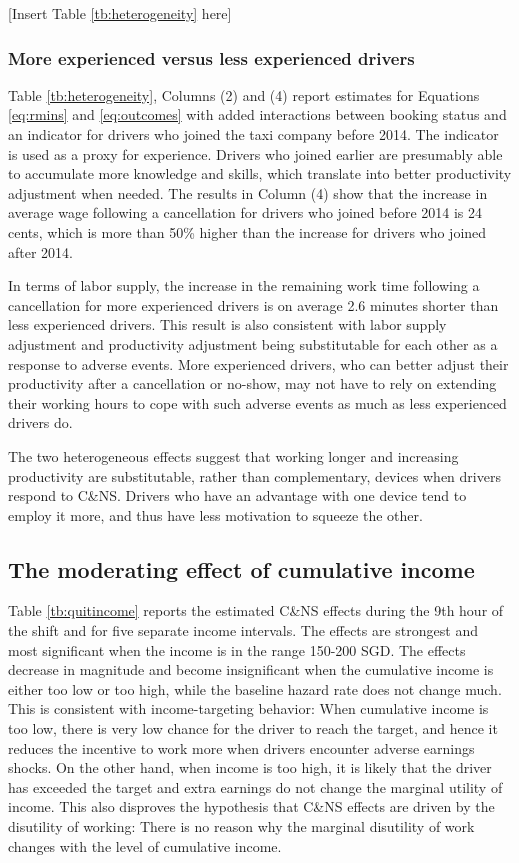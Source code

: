 \documentclass[reviewmode,AEJ]{AEA}
\begin{document}
\begin{center}
	[Insert Table \ref{tb:heterogeneity} here]
\end{center}


\subsubsection{More experienced versus less experienced drivers}

Table \ref{tb:heterogeneity}, Columns (2) and (4) report estimates for Equations \eqref{eq:rmins} and 
\eqref{eq:outcomes} with added interactions between booking status and an indicator for drivers who 
joined the taxi company before 2014. The indicator is used as a proxy for experience. Drivers who joined
earlier are presumably able to accumulate more knowledge and skills, which translate into better
productivity adjustment when needed. The results in Column (4) show that the increase in average wage 
following a cancellation for drivers who joined before 2014 is 24 cents, which is more than 50\% higher
than the increase for drivers who joined after 2014.

In terms of labor supply, the increase in the remaining work time following a cancellation for more 
experienced drivers is on average 2.6 minutes shorter than less experienced drivers. This result is also
consistent with labor supply adjustment and productivity adjustment being substitutable for each other as
a response to adverse events. More experienced drivers, who can better adjust their productivity after a 
cancellation or no-show, may not have to rely on extending their working hours to cope with such adverse 
events as much as less experienced drivers do.

The two heterogeneous effects suggest that working longer and increasing productivity are substitutable, 
rather than complementary, devices when drivers respond to C\&NS. Drivers who have an advantage with one 
device tend to employ it more, and thus have less motivation to squeeze the other.

\subsection{The moderating effect of cumulative income} Table \ref{tb:quitincome} reports the estimated 
C\&NS effects during the 9th hour of the shift and for five separate income intervals. The effects are 
strongest and most significant when the income is in the range 150-200 SGD. The effects decrease in
magnitude and become insignificant when the cumulative income is either too low or too high, while the
baseline hazard rate does not change much. This is consistent with income-targeting behavior: When 
cumulative income is too low, there is very low chance for the driver to reach the target, and hence 
it reduces the incentive to work more when drivers encounter adverse earnings shocks. On the other hand,
when income is too high, it is likely that the driver has exceeded the target and extra earnings do not 
change the marginal utility of income. This also disproves the hypothesis that C\&NS effects are driven 
by the disutility of working: There is no reason why the marginal disutility of work changes with the 
level of cumulative income.
\end{document}
